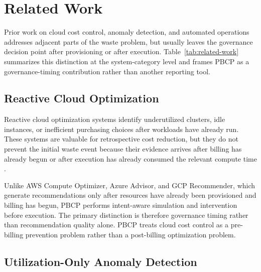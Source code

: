 \section{Related Work}


Prior work on cloud cost control, anomaly detection, and automated operations
addresses adjacent parts of the waste problem, but usually leaves the governance
decision point after provisioning or after execution. Table~\ref{tab:related-work}
summarizes this distinction at the system-category level and frames PBCP as a
governance-timing contribution rather than another reporting tool.

\begin{table}[t]
\centering
\small
\caption{Comparison of system categories by intervention timing and governance capability. PBCP is positioned around pre-billing intervention rather than post-billing recommendation.}
\label{tab:related-work}

\end{table}

\subsection{Reactive Cloud Optimization}

Reactive cloud optimization systems identify underutilized clusters, idle
instances, or inefficient purchasing choices after workloads have already run.
These systems are valuable for retrospective cost reduction, but they do not
prevent the initial waste event because their evidence arrives after billing has
already begun or after execution has already consumed the relevant compute time
\cite{aws-compute-optimizer,azure-advisor,gcp-recommender}.

Unlike AWS Compute Optimizer, Azure Advisor, and GCP Recommender, which
generate recommendations only after resources have already been provisioned and
billing has begun, PBCP performs intent-aware simulation and intervention before
execution. The primary distinction is therefore governance timing rather than
recommendation quality alone. PBCP treats cloud cost control as a pre-billing
prevention problem rather than a post-billing optimization problem.

\subsection{Utilization-Only Anomaly Detection}

